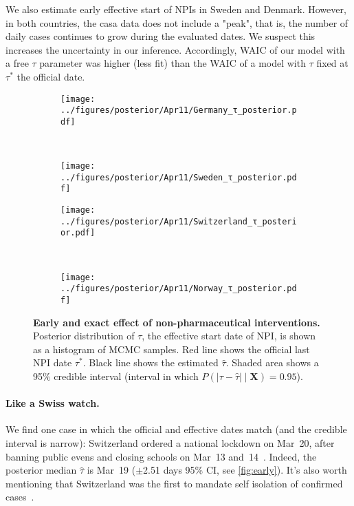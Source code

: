 \documentclass[12pt]{extarticle}
\let\vec\mathbf
\begin{document}
We also estimate early effective start of NPIs in Sweden and Denmark. However, in both countries, the casa data does not include a "peak", that is, the number of daily cases continues to grow during the evaluated dates. We suspect this increases the uncertainty in our inference.
Accordingly, WAIC of our model with a free $\tau$ parameter was higher (less fit) than the WAIC of a model with $\tau$ fixed at $\tau^*$ the official date.



\begin{figure}[h]
    \centering
    \begin{subfigure}{0.45\textwidth}
        \texttt{[image: ../figures/posterior/Apr11/Germany\_τ\_posterior.pdf]}
    \end{subfigure}
    ~
    \begin{subfigure}{0.45\textwidth}
		\texttt{[image: ../figures/posterior/Apr11/Sweden\_τ\_posterior.pdf]}
    \end{subfigure}
    
	\begin{subfigure}{0.45\textwidth}
        \texttt{[image: ../figures/posterior/Apr11/Switzerland\_τ\_posterior.pdf]}
    \end{subfigure}
    ~
    \begin{subfigure}{0.45\textwidth}
		\texttt{[image: ../figures/posterior/Apr11/Norway\_τ\_posterior.pdf]}
    \end{subfigure}
    \caption{
    \textbf{Early and exact effect of non-pharmaceutical interventions.}
    Posterior distribution of $\tau$, the effective start date of NPI, is shown as a histogram of MCMC samples. Red line shows the official last NPI date $\tau^*$. Black line shows the estimated $\hat{\tau}$. Shaded area shows a 95\% credible interval (interval in which $P(|\tau - \hat{\tau}| \mid \vec{X}) = 0.95$). 
	}
	\label{fig:early}
\end{figure}


\paragraph*{Like a Swiss watch.}
We find one case in which the official and effective dates match (and the credible interval is narrow): Switzerland ordered a national lockdown on Mar~20, after banning public evens and closing schools on Mar~13 and~14~\citep{Flaxman2020}.
Indeed, the posterior median $\hat{\tau}$ is Mar~19 ($\pm$2.51 days 95\% CI, see \autoref{fig:early}). It's also worth mentioning that Switzerland was the first to mandate self isolation of confirmed cases~\citep{Flaxman2020}.
\end{document}
